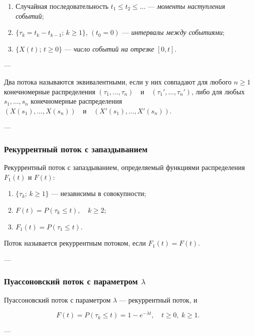 \begin{enumerate}
	\item Случайная последовательность
	      $t_1 \le t_2 \le \ldots$
	      — \textit{моменты наступления событий};

	\item
	      $\{\tau_k = t_k - t_{k-1}; \, k \ge 1\}$,
	      $(t_0 = 0)$ —
	      \textit{интервалы между событиями};

	\item
	      $\{ X(t); \, t \ge 0 \}$ —
	      \textit{число событий на отрезке} $[0, t]$.
\end{enumerate}

---

Два потока называются эквивалентными, если у них совпадают
для любого $n \ge 1$ конечномерные распределения
$(\tau_1, \ldots, \tau_n) \quad \text{и} \quad (\tau_1', \ldots, \tau_n')$,
либо для любых $s_1, \ldots, s_n$ конечномерные распределения
$(X(s_1), \ldots, X(s_n)) \quad \text{и} \quad (X'(s_1), \ldots, X'(s_n))$.

---

\subsubsection*{Рекуррентный поток с запаздыванием}

Рекуррентный поток с запаздыванием, определяемый функциями распределения $F_1(t)$ и $F(t)$:

\begin{enumerate}
	\item $\{\tau_k; \, k \ge 1\}$ — независимы в совокупности;
	\item $F(t) = P(\tau_k \le t), \quad k \ge 2$;
	\item $F_1(t) = P(\tau_1 \le t)$.
\end{enumerate}

Поток называется рекуррентным потоком, если $F_1(t) = F(t)$.

---

\subsubsection*{Пуассоновский поток с параметром $\lambda$}

Пуассоновский поток с параметром $\lambda$ — рекуррентный поток, и

\[
	F(t) = P(\tau_k \le t) = 1 - e^{-\lambda t},
	\quad t \ge 0, \; k \ge 1.
\]

---

